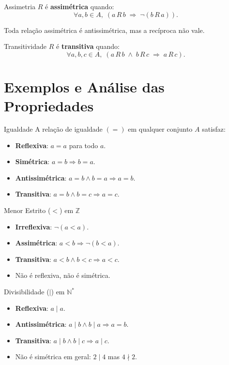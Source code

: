 \documentclass[12pt,a4paper]{book}
\begin{document}
\begin{definicao}{Assimetria}{}
$R$ é \textbf{assimétrica} quando:
\[
  \forall a,b \in A,\; (a\,R\,b \;\Rightarrow\; \neg(b\,R\,a)).
\]
\end{definicao}

Toda relação assimétrica é antissimétrica, mas a recíproca não vale.

\begin{definicao}{Transitividade}{}
$R$ é \textbf{transitiva} quando:
\[
  \forall a,b,c \in A,\; (a\,R\,b \;\land\; b\,R\,c \;\Rightarrow\; a\,R\,c).
\]
\end{definicao}

\section{Exemplos e Análise das Propriedades}

\begin{exemplo}{Igualdade}{}
A relação de igualdade $(=)$ em qualquer conjunto $A$ satisfaz:
\begin{itemize}
  \item \textbf{Reflexiva}: $a = a$ para todo $a$. \checkmark
  \item \textbf{Simétrica}: $a = b \Rightarrow b = a$. \checkmark
  \item \textbf{Antissimétrica}: $a = b \land b = a \Rightarrow a = b$. \checkmark
  \item \textbf{Transitiva}: $a=b \land b=c \Rightarrow a=c$. \checkmark
\end{itemize}
\end{exemplo}

\begin{exemplo}{Menor Estrito ($<$) em $\mathbb{Z}$}{}
\begin{itemize}
  \item \textbf{Irreflexiva}: $\neg(a < a)$. \checkmark
  \item \textbf{Assimétrica}: $a < b \Rightarrow \neg(b < a)$. \checkmark
  \item \textbf{Transitiva}: $a < b \land b < c \Rightarrow a < c$. \checkmark
  \item Não é reflexiva, não é simétrica.
\end{itemize}
\end{exemplo}

\begin{exemplo}{Divisibilidade ($\mid$) em $\mathbb{N}^*$}{}
\begin{itemize}
  \item \textbf{Reflexiva}: $a \mid a$. \checkmark
  \item \textbf{Antissimétrica}: $a \mid b \land b \mid a \Rightarrow a = b$. \checkmark
  \item \textbf{Transitiva}: $a \mid b \land b \mid c \Rightarrow a \mid c$. \checkmark
  \item Não é simétrica em geral: $2 \mid 4$ mas $4 \nmid 2$.
\end{itemize}
\end{exemplo}
\end{document}
